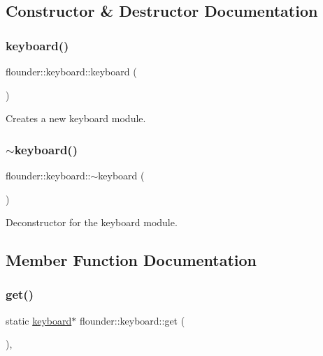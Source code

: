 \subsection{Constructor \& Destructor Documentation}
\mbox{\label{classflounder_1_1keyboard_a2545f195eb7f57530cdc9056f641702c}} 
\subsubsection{\texorpdfstring{keyboard()}{keyboard()}}
{\footnotesize\ttfamily flounder\+::keyboard\+::keyboard (\begin{DoxyParamCaption}{ }\end{DoxyParamCaption})}



Creates a new keyboard module. 

\mbox{\label{classflounder_1_1keyboard_ac78be35918c4741e37bc0d35976f5a4a}} 
\subsubsection{\texorpdfstring{$\sim$keyboard()}{~keyboard()}}
{\footnotesize\ttfamily flounder\+::keyboard\+::$\sim$keyboard (\begin{DoxyParamCaption}{ }\end{DoxyParamCaption})\hspace{0.3cm}{\ttfamily [override]}}



Deconstructor for the keyboard module. 



\subsection{Member Function Documentation}
\mbox{\label{classflounder_1_1keyboard_a7493bf7e18bf4b5fc7679a3e8b10ec27}} 
\subsubsection{\texorpdfstring{get()}{get()}}
{\footnotesize\ttfamily static \hyperlink{classflounder_1_1keyboard}{keyboard}$\ast$ flounder\+::keyboard\+::get (\begin{DoxyParamCaption}{ }\end{DoxyParamCaption})\hspace{0.3cm}{\ttfamily [inline]}, {\ttfamily [static]}}



